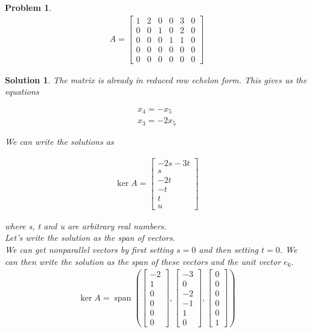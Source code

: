 \documentclass{article}
\newtheorem{problem}{Problem}
\newtheorem*{solution}{Solution}
\DeclareMathOperator{\Span}{span}
\begin{document}
\begin{problem}
\begin{align*}
A = \begin{bmatrix}1 & 2 & 0 & 0 & 3 & 0 \\ 0 & 0 & 1 & 0 & 2 & 0 \\ 0 & 0 & 0 & 1 & 1 & 0 \\ 0 & 0 & 0 & 0 & 0 & 0 \\ 0 & 0 & 0 & 0 & 0 & 0 \end{bmatrix}
\end{align*}
\end{problem}

\begin{solution}
The matrix is already in reduced row echelon form. This gives us the equations 

\begin{align*}
x_{4} = -x_{5} \\
x_{3} = -2x_{5}
\end{align*}

We can write the solutions as

\begin{align*}
\ker A = \begin{bmatrix}
-2s - 3t \\ s \\ -2t \\ -t \\ t \\ u
\end{bmatrix}
\end{align*}

where s, t and u are arbitrary real numbers. \\

Let's write the solution as the span of vectors. \\

We can get nonparallel vectors by first setting $s = 0$ and then setting $t = 0$. We can then write the solution as the span of these vectors and the unit vector $e_{6}$. \\

\begin{align*}
\ker A = \Span \left( 
\begin{bmatrix}
-2 \\ 1 \\ 0 \\ 0 \\ 0 \\ 0
\end{bmatrix}, 
\begin{bmatrix}
-3 \\ 0 \\ -2 \\ -1 \\ 1 \\ 0
\end{bmatrix}, 
\begin{bmatrix}
0 \\ 0 \\ 0 \\ 0 \\ 0 \\ 1
\end{bmatrix} \right)
\end{align*}
\end{solution}
\end{document}

